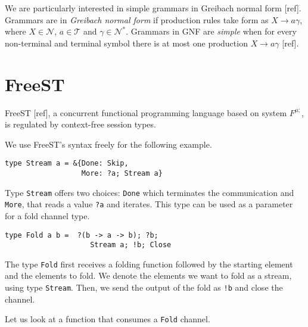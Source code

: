 We are particularly interested in simple grammars in Greibach normal form [ref]. Grammars are in \textit{Greibach normal form} if production rules take form as $X \rightarrow a\gamma$, where $X\in\mathcal{N}$, $a\in\mathcal{T}$ and $\gamma\in\mathcal{N}^*$. Grammars in GNF are \emph{simple} when for every non-terminal and terminal symbol there is at most one production $X \rightarrow a\gamma$ [ref].


\section{FreeST}
FreeST [ref], a concurrent functional programming language based on system $F^{\mu;}$, is regulated by context-free session types.


We use FreeST's syntax freely for the following example.

\begin{lstlisting}
type Stream a = &{Done: Skip, 
                  More: ?a; Stream a}
\end{lstlisting}

Type \lstinline|Stream| offers two choices: \lstinline|Done| which terminates the communication and \lstinline|More|, that reads a value \lstinline|?a| and iterates.
This type can be used as a parameter for a fold channel type.

\begin{lstlisting}
type Fold a b =  ?(b -> a -> b); ?b;
                    Stream a; !b; Close
\end{lstlisting}
\vspace{3mm}

The type \lstinline|Fold| first receives a folding function followed by the starting element and the elements to fold. We denote the elements we want to fold as a stream, using type \lstinline|Stream|. Then, we send the output of the fold as \lstinline|!b| and close the channel.

Let us look at a function that consumes a \lstinline|Fold| channel.

